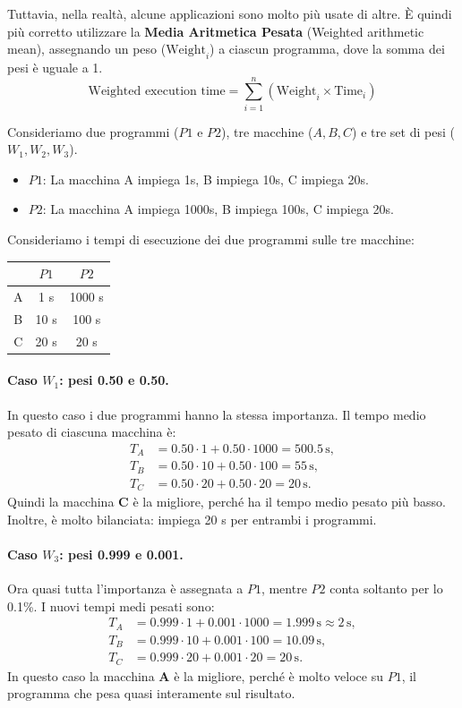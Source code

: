 Tuttavia, nella realtà, alcune applicazioni sono molto più usate di altre. È quindi più corretto utilizzare la \textbf{Media Aritmetica Pesata} (Weighted arithmetic mean), assegnando un peso (\( \text{Weight}_i \)) a ciascun programma, dove la somma dei pesi è uguale a 1.
\[ \text{Weighted execution time} = \sum_{i=1}^{n} \left( \text{Weight}_i \times \text{Time}_i \right) \]

\begin{example}
Consideriamo due programmi (\(P1\) e \(P2\)), tre macchine (\(A, B, C\)) e tre set di pesi (\(W_1, W_2, W_3\)).
\begin{itemize}
    \item \( P1 \): La macchina A impiega 1s, B impiega 10s, C impiega 20s.
    \item \( P2 \): La macchina A impiega 1000s, B impiega 100s, C impiega 20s.
\end{itemize}
Consideriamo i tempi di esecuzione dei due programmi sulle tre macchine:
\begin{center}
\begin{tabular}{c|cc}
    & \(P1\) & \(P2\) \\
    \hline
    A & 1 s & 1000 s \\
    B & 10 s & 100 s \\
    C & 20 s & 20 s
\end{tabular}
\end{center}

\paragraph{Caso \(W_1\): pesi 0.50 e 0.50.}
In questo caso i due programmi hanno la stessa importanza. Il tempo medio pesato di ciascuna macchina è:
\begin{align*}
    T_A &= 0.50 \cdot 1 + 0.50 \cdot 1000 = 500.5\,\text{s}, \\
    T_B &= 0.50 \cdot 10 + 0.50 \cdot 100 = 55\,\text{s}, \\
    T_C &= 0.50 \cdot 20 + 0.50 \cdot 20 = 20\,\text{s}.
\end{align*}
Quindi la macchina \textbf{C} è la migliore, perché ha il tempo medio pesato più basso. Inoltre, è molto bilanciata: impiega 20 s per entrambi i programmi.

\paragraph{Caso \(W_3\): pesi 0.999 e 0.001.}
Ora quasi tutta l'importanza è assegnata a \(P1\), mentre \(P2\) conta soltanto per lo 0.1\%. I nuovi tempi medi pesati sono:
\begin{align*}
    T_A &= 0.999 \cdot 1 + 0.001 \cdot 1000 = 1.999\,\text{s} \approx 2\,\text{s}, \\
    T_B &= 0.999 \cdot 10 + 0.001 \cdot 100 = 10.09\,\text{s}, \\
    T_C &= 0.999 \cdot 20 + 0.001 \cdot 20 = 20\,\text{s}.
\end{align*}
In questo caso la macchina \textbf{A} è la migliore, perché è molto veloce su \(P1\), il programma che pesa quasi interamente sul risultato.


\end{example}
